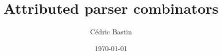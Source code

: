 \documentclass[a4paper]{article}
\title{Attributed parser combinators}
\author{Cédric Bastin}
\date{\today}
\begin{document}
\maketitle

\begin{abstract}

\end{abstract}



%
%
%









\end{document}
